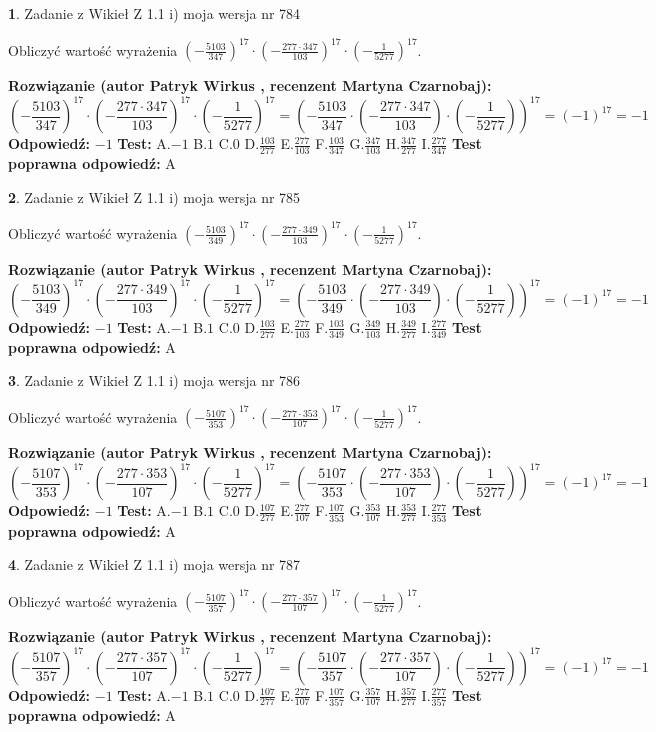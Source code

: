 \documentclass[12pt, a4paper]{article}
\theoremstyle{definition} %
\newtheorem{zad}{}
\newcommand{\zadStart}[1]{\begin{zad}#1\newline}
\newcommand{\zadStop}{\end{zad}}
\newcommand{\rozwStart}[2]{\noindent \textbf{Rozwiązanie (autor #1 , recenzent #2): }\newline}
\newcommand{\rozwStop}{\newline}
\newcommand{\odpStart}{\noindent \textbf{Odpowiedź:}\newline}
\newcommand{\odpStop}{\newline}
\newcommand{\testStart}{\noindent \textbf{Test:}\newline}
\newcommand{\testStop}{\newline}
\newcommand{\kluczStart}{\noindent \textbf{Test poprawna odpowiedź:}\newline}
\newcommand{\kluczStop}{\newline}
\begin{document}
\zadStart{Zadanie z Wikieł Z 1.1 i) moja wersja nr 784}

Obliczyć wartość wyrażenia $(-\frac{5103}{347})^{17} \cdot (-\frac{277 \cdot 347}{103})^{17} \cdot (-\frac{1}{5277})^{17}$.
\zadStop
\rozwStart{Patryk Wirkus}{Martyna Czarnobaj}
$$(-\frac{5103}{347})^{17} \cdot (-\frac{277 \cdot 347}{103})^{17} \cdot (-\frac{1}{5277})^{17} = (-\frac{5103}{347} \cdot (-\frac{277 \cdot 347}{103}) \cdot (-\frac{1}{5277}))^{17} = (-1)^{17} = -1$$
\rozwStop
\odpStart
$-1$
\odpStop
\testStart
A.$-1$ B.$1$ C.$0$ D.$\frac{103}{277}$ E.$\frac{277}{103}$
F.$\frac{103}{347}$ G.$\frac{347}{103}$
H.$\frac{347}{277}$
I.$\frac{277}{347}$
\testStop
\kluczStart
A
\kluczStop



\zadStart{Zadanie z Wikieł Z 1.1 i) moja wersja nr 785}

Obliczyć wartość wyrażenia $(-\frac{5103}{349})^{17} \cdot (-\frac{277 \cdot 349}{103})^{17} \cdot (-\frac{1}{5277})^{17}$.
\zadStop
\rozwStart{Patryk Wirkus}{Martyna Czarnobaj}
$$(-\frac{5103}{349})^{17} \cdot (-\frac{277 \cdot 349}{103})^{17} \cdot (-\frac{1}{5277})^{17} = (-\frac{5103}{349} \cdot (-\frac{277 \cdot 349}{103}) \cdot (-\frac{1}{5277}))^{17} = (-1)^{17} = -1$$
\rozwStop
\odpStart
$-1$
\odpStop
\testStart
A.$-1$ B.$1$ C.$0$ D.$\frac{103}{277}$ E.$\frac{277}{103}$
F.$\frac{103}{349}$ G.$\frac{349}{103}$
H.$\frac{349}{277}$
I.$\frac{277}{349}$
\testStop
\kluczStart
A
\kluczStop



\zadStart{Zadanie z Wikieł Z 1.1 i) moja wersja nr 786}

Obliczyć wartość wyrażenia $(-\frac{5107}{353})^{17} \cdot (-\frac{277 \cdot 353}{107})^{17} \cdot (-\frac{1}{5277})^{17}$.
\zadStop
\rozwStart{Patryk Wirkus}{Martyna Czarnobaj}
$$(-\frac{5107}{353})^{17} \cdot (-\frac{277 \cdot 353}{107})^{17} \cdot (-\frac{1}{5277})^{17} = (-\frac{5107}{353} \cdot (-\frac{277 \cdot 353}{107}) \cdot (-\frac{1}{5277}))^{17} = (-1)^{17} = -1$$
\rozwStop
\odpStart
$-1$
\odpStop
\testStart
A.$-1$ B.$1$ C.$0$ D.$\frac{107}{277}$ E.$\frac{277}{107}$
F.$\frac{107}{353}$ G.$\frac{353}{107}$
H.$\frac{353}{277}$
I.$\frac{277}{353}$
\testStop
\kluczStart
A
\kluczStop



\zadStart{Zadanie z Wikieł Z 1.1 i) moja wersja nr 787}

Obliczyć wartość wyrażenia $(-\frac{5107}{357})^{17} \cdot (-\frac{277 \cdot 357}{107})^{17} \cdot (-\frac{1}{5277})^{17}$.
\zadStop
\rozwStart{Patryk Wirkus}{Martyna Czarnobaj}
$$(-\frac{5107}{357})^{17} \cdot (-\frac{277 \cdot 357}{107})^{17} \cdot (-\frac{1}{5277})^{17} = (-\frac{5107}{357} \cdot (-\frac{277 \cdot 357}{107}) \cdot (-\frac{1}{5277}))^{17} = (-1)^{17} = -1$$
\rozwStop
\odpStart
$-1$
\odpStop
\testStart
A.$-1$ B.$1$ C.$0$ D.$\frac{107}{277}$ E.$\frac{277}{107}$
F.$\frac{107}{357}$ G.$\frac{357}{107}$
H.$\frac{357}{277}$
I.$\frac{277}{357}$
\testStop
\kluczStart
A
\kluczStop
\end{document}
